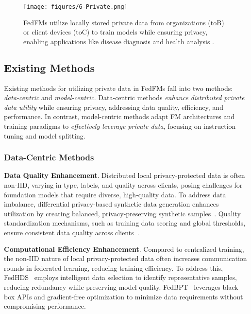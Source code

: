 


\begin{figure}[]
    \centering
\texttt{[image: figures/6-Private.png]}
    \caption{FedFMs utilize locally stored private data from organizations (toB) or client devices (toC) to train models while ensuring privacy, enabling applications like disease diagnosis and health analysis \cite{6-data-fedcampus}. }
    \label{fig:UtilPrivateData}
    \vspace{-5mm}
\end{figure}


\subsection{Existing Methods}
Existing methods for utilizing private data in FedFMs fall into two methods: \textit{data-centric} and \textit{model-centric}. Data-centric methods \textit{enhance distributed private data utility} while ensuring privacy, addressing data quality, efficiency, and performance. In contrast, model-centric methods adapt FM architectures and training paradigms to \textit{effectively leverage private data}, focusing on instruction tuning and model splitting.

\subsubsection{Data-Centric Methods } 


\textbf{Data Quality Enhancement}. Distributed local privacy-protected data is often non-IID, varying in type, labels, and quality across clients, posing challenges for foundation models that require diverse, high-quality data. To address data imbalance, differential privacy-based synthetic data generation enhances utilization by creating balanced, privacy-preserving synthetic samples~\cite{6-data-dpsda}. Quality standardization mechanisms, such as training data scoring and global thresholds, ensure consistent data quality across clients~\cite{zhao2024enhancing}.


\textbf{Computational Efficiency Enhancement}. 
Compared to centralized training, the non-IID nature of local privacy-protected data often increases communication rounds in federated learning, reducing training efficiency. To address this, FedHDS~\cite{qin2023federated} employs intelligent data selection to identify representative samples, reducing redundancy while preserving model quality. FedBPT~\cite{pmlr-v235-sun24j} leverages black-box APIs and gradient-free optimization to minimize data requirements without compromising performance.


